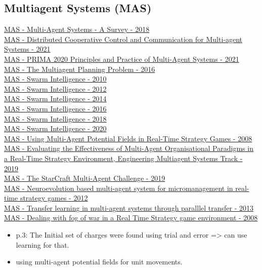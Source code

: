 \subsection{Multiagent Systems (MAS)}
\href{https://ieeexplore.ieee.org/abstract/document/8352646}{MAS - Multi-Agent Systems - A Survey - 2018}
\\
\href{https://link.springer.com/book/10.1007%2F978-981-33-6718-0}{MAS - Distributed Cooperative Control and Communication for Multi-agent Systems - 2021}
\\
\href{https://link.springer.com/book/10.1007%2F978-3-030-69322-0}{MAS - PRIMA 2020 Principles and Practice of Multi-Agent Systems - 2021}
\\
\href{https://www.hindawi.com/journals/complexity/2017/3813912/}{MAS - The Multiagent Planning Problem - 2016}
\\
\href{https://link.springer.com/book/10.1007/978-3-642-15461-4}{MAS - Swarm Intelligence - 2010}
\\
\href{https://link.springer.com/book/10.1007/978-3-642-32650-9}{MAS - Swarm Intelligence - 2012}
\\
\href{https://link.springer.com/book/10.1007/978-3-319-09952-1}{MAS - Swarm Intelligence - 2014}
\\
\href{https://link.springer.com/book/10.1007/978-3-319-44427-7}{MAS - Swarm Intelligence - 2016}
\\
\href{https://link.springer.com/book/10.1007/978-3-030-00533-7}{MAS - Swarm Intelligence - 2018}
\\
\href{https://link.springer.com/book/10.1007/978-3-030-60376-2}{MAS - Swarm Intelligence - 2020}
\\
\href{https://www.diva-portal.org/smash/record.jsf?pid=diva2%3A805249&dswid=2610}{MAS - Using Multi-Agent Potential Fields in Real-Time Strategy Games - 2008}
\\
\href{https://dl.acm.org/doi/abs/10.5555/3306127.3331766}{MAS - Evaluating the Effectiveness of Multi-Agent Organisational Paradigms in a Real-Time Strategy Environment, Engineering Multiagent Systems Track - 2019}
\\
\href{https://dl.acm.org/doi/10.5555/3306127.3332052}{MAS - The StarCraft Multi-Agent Challenge - 2019}
\\
\href{https://dl.acm.org/doi/abs/10.1145/2371316.2371324}{MAS - Neuroevolution based multi-agent system for micromanagement in real-time strategy games - 2012}
\\
\href{https://ulir.ul.ie/handle/10344/3305}{MAS - Transfer learning in multi-agent systems through paralllel transfer - 2013}
\\
\href{https://ieeexplore.ieee.org/document/5035621}{MAS - Dealing with fog of war in a Real Time Strategy game environment - 2008}
\begin{itemize}[noitemsep,nolistsep]
	\item p.3: The Initial set of charges were found using trial and error => can use learning for that.
	\item using multi-agent potential fields for unit movements.
\end{itemize}



